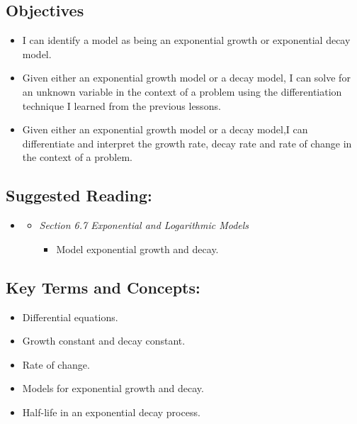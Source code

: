 
\vspace{-0.25 in}
\begin{framed}
\subsection*{Objectives}
\begin{itemize}
    \item I can identify a model as being an exponential growth or exponential decay model.
	\item Given either an exponential growth model or a decay model, I can solve for an unknown variable in the context of a problem using the differentiation technique I learned from the previous lessons. 
	\item Given either an exponential growth model or a decay model,I can differentiate and interpret the growth rate, decay rate and rate of change in the context of a problem.
\end{itemize}

\subsection*{Suggested Reading:}
\begin{itemize}
\item \cite{openstaxColAlgebra}\footnotemark[1]
    \begin{itemize}
        \item \emph{Section 6.7 Exponential and Logarithmic Models}
        \begin{itemize}
            \item Model exponential growth and decay.
        \end{itemize}
    \end{itemize}
   
\end{itemize}
\subsection*{Key Terms and Concepts:} 

\begin{itemize}
    \item Differential equations.
    \item Growth constant and decay constant.
    \item Rate of change.
    \item Models for exponential growth and decay.
    \item Half-life in an exponential decay process.
\end{itemize}
\end{framed}

